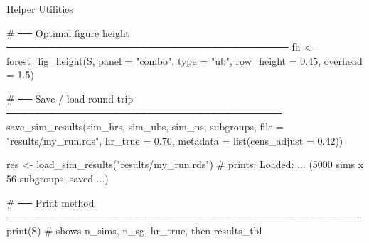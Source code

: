 \documentclass[
  11pt,
  ignorenonframetext,
  aspectratio=169,
]{beamer}
\newenvironment{Shaded}{\begin{snugshade}}{\end{snugshade}}
\newcommand{\AttributeTok}[1]{\textcolor[rgb]{0.40,0.45,0.13}{#1}}
\newcommand{\CommentTok}[1]{\textcolor[rgb]{0.37,0.37,0.37}{#1}}
\newcommand{\FloatTok}[1]{\textcolor[rgb]{0.68,0.00,0.00}{#1}}
\newcommand{\FunctionTok}[1]{\textcolor[rgb]{0.28,0.35,0.67}{#1}}
\newcommand{\NormalTok}[1]{\textcolor[rgb]{0.00,0.23,0.31}{#1}}
\newcommand{\OtherTok}[1]{\textcolor[rgb]{0.00,0.23,0.31}{#1}}
\newcommand{\StringTok}[1]{\textcolor[rgb]{0.13,0.47,0.30}{#1}}
\begin{document}
\begin{frame}[fragile]{Helper Utilities}
\label{helper-utilities}
\footnotesize

\begin{Shaded}
\begin{Highlighting}[]
\CommentTok{\# ── Optimal figure height ────────────────────────────────────────}
\NormalTok{fh }\OtherTok{\textless{}{-}} \FunctionTok{forest\_fig\_height}\NormalTok{(S, }\AttributeTok{panel =} \StringTok{"combo"}\NormalTok{, }\AttributeTok{type =} \StringTok{"ub"}\NormalTok{,}
                         \AttributeTok{row\_height =} \FloatTok{0.45}\NormalTok{, }\AttributeTok{overhead =} \FloatTok{1.5}\NormalTok{)}

\CommentTok{\# ── Save / load round{-}trip ───────────────────────────────────────}
\FunctionTok{save\_sim\_results}\NormalTok{(sim\_hrs, sim\_ubs, sim\_ns, subgroups,}
                 \AttributeTok{file =} \StringTok{"results/my\_run.rds"}\NormalTok{, }\AttributeTok{hr\_true =} \FloatTok{0.70}\NormalTok{,}
                 \AttributeTok{metadata =} \FunctionTok{list}\NormalTok{(}\AttributeTok{cens\_adjust =} \FloatTok{0.42}\NormalTok{))}

\NormalTok{res }\OtherTok{\textless{}{-}} \FunctionTok{load\_sim\_results}\NormalTok{(}\StringTok{"results/my\_run.rds"}\NormalTok{)}
\CommentTok{\# prints: Loaded: ... (5000 sims x 56 subgroups, saved ...)}

\CommentTok{\# ── Print method ──────────────────────────────────────────────────}
\FunctionTok{print}\NormalTok{(S)   }\CommentTok{\# shows n\_sims, n\_sg, hr\_true, then results\_tbl}
\end{Highlighting}
\end{Shaded}
\end{frame}
\end{document}
